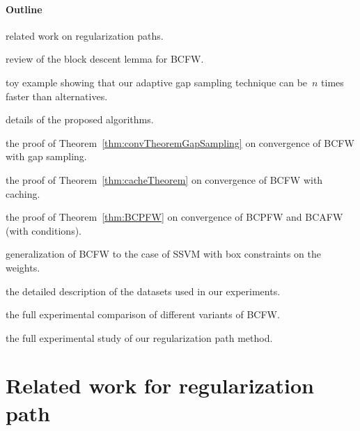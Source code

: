 \documentclass{article}
\begin{document}
%

%




%
\clearpage
\appendix

%
%
%


\paragraph{Outline} 
\begin{description}[itemsep=0mm,topsep=0cm,leftmargin=0cm,font=\normalfont]
\renewcommand\labelitemi{--}
\item[Appendix~\ref{app:relatedWorkRegPath}:] related work on regularization paths.
\item[Appendix~\ref{app:descent_lemma}:] review of the block descent lemma for BCFW.
\item[Appendix~\ref{app:toy_example}:] toy example showing that our adaptive gap sampling technique can be~$n$ times faster than alternatives.
\item[Appendix~\ref{app:algorithms}:] details of the proposed algorithms.
\item[Appendix~\ref{app:proof_gap_sampling}:] the proof of Theorem~\ref{thm:convTheoremGapSampling} on convergence of BCFW with gap sampling.
\item[Appendix~\ref{app:caching_theorem}:] the proof of Theorem~\ref{thm:cacheTheorem} on convergence of BCFW with caching.
\item[Appendix~\ref{app:BCPFWconvergence}:] the proof of Theorem~\ref{thm:BCPFW} on convergence of BCPFW and BCAFW (with conditions).
\item[Appendix~\ref{app:pos_const}:] generalization of BCFW to the case of SSVM with box constraints on the weights.
\item[Appendix~\ref{app:dataset_table}:] the detailed description of the datasets used in our experiments.
\item[Appendix~\ref{app:exp1}:] the full experimental comparison of different variants of BCFW.
\item[Appendix~\ref{app:exp2}:] the full experimental study of our regularization path method.
\end{description}

\section{Related work for regularization path} \label{app:relatedWorkRegPath}
\end{document}
